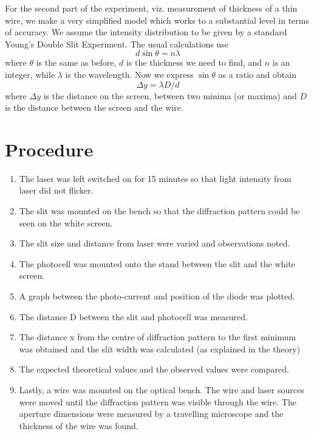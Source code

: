 	For the second part of the experiment, viz. measurement of thickness of a thin wire, we make a very simplified model which works to a substantial level in terms of accuracy. We assume the intensity distribution to be given by a standard Young's Double Slit Experiment. The usual calculations use 
	\begin{equation}
		d \sin{\theta}=n\lambda
	\end{equation}
	where $\theta$ is the same as before, $d$ is the thickness we need to find, and $n$ is an integer, while $\lambda$ is the wavelength. Now we express $\sin{\theta}$ as a ratio and obtain 
	\begin{equation}
		\Delta y = \lambda D /d
		\label{E3_2}
	\end{equation}
	where $\Delta y$ is the distance on the screen, between two minima (or maxima) and $D$ is the distance between the screen and the wire. 

\section{Procedure}
	\begin{enumerate}
		\item The laser was left switched on for 15 minutes so that light intensity from laser did not flicker.
		\item The slit was mounted on the bench so that the diffraction pattern could be seen on the white screen.
		\item The slit size and distance from laser were varied and observations noted.
		\item The photocell was mounted onto the stand between the slit and the white screen.
		\item A graph between the photo-current and position of the diode was plotted.
		\item The distance D between the slit and photocell was measured.
		\item The distance x from the centre of diffraction pattern to the first minimum was obtained and the slit width was calculated (as explained in the theory)
		\item The expected theoretical values and the observed values were compared.
		\item Lastly, a wire was mounted on the optical bench. The wire and laser sources were moved until the diffraction pattern was visible through the wire. The aperture dimensions were measured by a travelling microscope and the thickness of the wire was found.  
	\end{enumerate}

